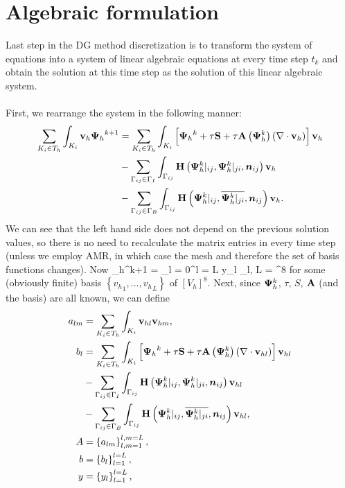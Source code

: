 \section{Algebraic formulation}
Last step in the DG method discretization is to transform the system of equations  into a system of linear algebraic equations at every time step $t_k$ and obtain the solution at this time step as the solution of this linear algebraic system.
\paragraph{}
First, we rearrange the system in the following manner:
\begin{align}
\label{RewrittenLinearSystem} \sum_{K_i \in T_h}\int_{K_i} \mathrm{\mathbf{v}}_h {\mathrm{\mathbf{\Psi}}_h}^{k+1} & = 
\sum_{K_i \in T_h}\int_{K_i} \left[{\mathrm{\mathbf{\Psi}}_h}^{k} + \tau\mathrm{\mathbf{S}} + \tau\mathrm{\mathbf{A}}\left({\mathrm{\mathbf{\Psi}}_h^{k}}\right) \left(\nabla \cdot \mathrm{\mathbf{v}}_h\right)\right] \mathrm{\mathbf{v}}_h \\\nonumber& - \sum_{\Gamma_{ij}\in\Gamma_I} \int_{\Gamma_{ij}}\mathrm{\mathbf{H}}\left({\mathrm{\mathbf{\Psi}}_h^{k}}|_{ij}, {\mathrm{\mathbf{\Psi}}_h^{k}}|_{ji}, \mbox{\boldmath $n$}_{ij}\right) \mathrm{\mathbf{v}}_h
\\\nonumber& - \sum_{\Gamma_{ij}\in\Gamma_B} \int_{\Gamma_{ij}} \mathrm{\mathbf{H}}\left({\mathrm{\mathbf{\Psi}}_h^{k}}|_{ij}, \overline{{\mathrm{\mathbf{\Psi}}_h^{k}}|_{ji}}, \mbox{\boldmath $n$}_{ij}\right) \mathrm{\mathbf{v}}_h.
\end{align}
We can see that the left hand side does not depend on the previous solution values, so there is no need to recalculate the matrix entries in every time step (unless we employ AMR, in which case the mesh and therefore the set of basis functions changes).
Now
\be
\label{Coeffs} {\mrPsi_h}^{k+1} = \sum_{l = 0}^{l = L} y_l {\mrvh}_l, L = \lo\left[V_h\right]^8\ro
\ee
for some (obviously finite) basis $\left\{{v_h}_1, ..., {v_h}_L\right\}$ of $\left[V_h\right]^8$.
Next, since $\mathrm{\mathbf{\Psi}}_h^{k}$, $\tau$, $S$, $\mathrm{\mathbf{A}}$ (and the basis) are all known, we can define
\begin{align}
\label{Linear1}
a_{lm} & =  \sum_{K_i \in T_h}\int_{K_i} \mathrm{\mathbf{v}}_{hl} \mathrm{\mathbf{v}}_{hm}, \\
\label{Linear2}
b_{l} & =  \sum_{K_i \in T_h}\int_{K_i} \left[{\mathrm{\mathbf{\Psi}}_h}^{k} + \tau\mathrm{\mathbf{S}} + \tau\mathrm{\mathbf{A}}\left({\mathrm{\mathbf{\Psi}}_h^{k}}\right) \left(\nabla \cdot \mathrm{\mathbf{v}}_{hl}\right)\right] \mathrm{\mathbf{v}}_{hl}\\\nonumber & - \sum_{\Gamma_{ij}\in\Gamma_I} \int_{\Gamma_{ij}}\mathrm{\mathbf{H}}\left({\mathrm{\mathbf{\Psi}}_h^{k}}|_{ij}, {\mathrm{\mathbf{\Psi}}_h^{k}}|_{ji}, \mbox{\boldmath $n$}_{ij}\right) \mathrm{\mathbf{v}}_{hl}\\\nonumber& - 
\sum_{\Gamma_{ij}\in\Gamma_B} \int_{\Gamma_{ij}} \mathrm{\mathbf{H}}\left({\mathrm{\mathbf{\Psi}}_h^{k}}|_{ij}, \overline{{\mathrm{\mathbf{\Psi}}_h^{k}}|_{ji}}, \mbox{\boldmath $n$}_{ij}\right) \mathrm{\mathbf{v}}_{hl},\\
\label{Linear3}
A & =  \left\{a_{lm}\right\}_{l,m = 1}^{l,m = L},\\
\label{Linear4}
b & =  \left\{b_{l}\right\}_{l = 1}^{l = L},\\
y & =  \left\{y_{l}\right\}_{l = 1}^{l = L},
\label{Linear5}
\end{align}
